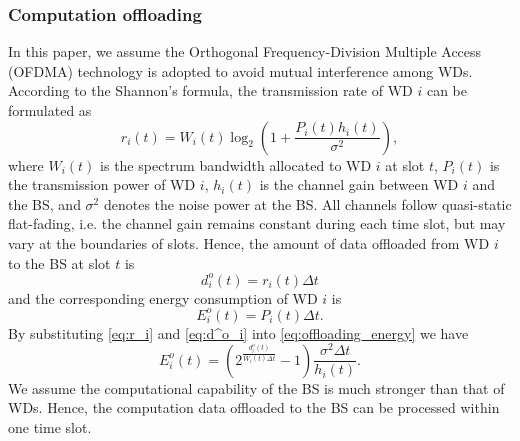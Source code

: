 \documentclass[lettersize, journal]{IEEEtran}
\begin{document}
\subsubsection{Computation offloading}
In this paper, we assume the Orthogonal Frequency-Division Multiple Access (OFDMA) technology is adopted to avoid mutual interference among WDs.
According to the Shannon's formula, the transmission rate of WD $i$ can be formulated as
\begin{equation}
    r_i(t) = W_i(t) \log_2 \left( 1 + \frac{P_i(t) h_i(t)}{\sigma^2} \right),
    \label{eq:r_i}
\end{equation}
where $W_i(t)$ is the spectrum bandwidth allocated to WD $i$ at slot $t$,
$P_i(t)$ is the transmission power of WD $i$,
$h_i(t)$ is the channel gain between WD $i$ and the BS,
and $\sigma^2$ denotes the noise power at the BS.
All channels follow quasi-static flat-fading, i.e. the channel gain remains constant during each time slot, 
but may vary at the boundaries of slots.
Hence, the amount of data offloaded from WD $i$ to the BS at slot $t$ is
\begin{equation}
    d^o_i(t) = r_i(t) \Delta t
    \label{eq:d^o_i}
\end{equation}
and the corresponding energy consumption of WD $i$ is
\begin{equation}
    E^o_i(t) = P_i(t) \Delta t. \label{eq:offloading_energy}
\end{equation}
By substituting \eqref{eq:r_i} and \eqref{eq:d^o_i} into \eqref{eq:offloading_energy} we have
\begin{equation}
    E^o_i(t) = \left( 2^{\frac{d^o_i(t)}{W_i(t)\Delta t}} - 1 \right) \frac{\sigma^2 \Delta t}{h_i(t)}.
    \label{eq:E^o_i}
\end{equation}
We assume the computational capability of the BS is much stronger than that of WDs.
Hence, the computation data offloaded to the BS can be processed within one time slot.
\end{document}
